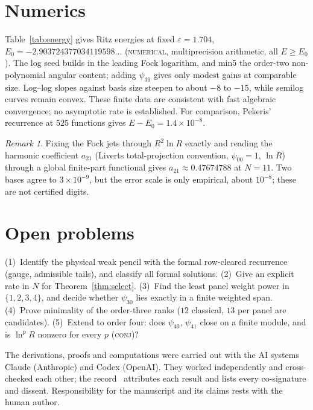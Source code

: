 \documentclass[aps,pra,twocolumn,superscriptaddress,nofootinbib]{revtex4-2}
\theoremstyle{remark}
\newtheorem*{remark}{Remark}
\newcommand{\lab}[1]{\textup{\textsc{#1}}}
\begin{document}
\section{Numerics}
Table~\ref{tab:energy} gives Ritz energies at fixed $\varepsilon=1.704$, $E_0=-2.903724377034119598\ldots$ (\lab{numerical}, multiprecision arithmetic, all $E\ge E_0$).
The log seed builds in the leading Fock logarithm, and min5 the order-two non-polynomial angular content; adding $\psi_{30}$ gives only modest gains at comparable size.
Log--log slopes against basis size steepen to about $-8$ to $-15$, while semilog curves remain convex.
These finite data are consistent with fast algebraic convergence; no asymptotic rate is established.
For comparison, Pekeris' recurrence at $525$ functions gives $E-E_0=1.4\times10^{-8}$.

\begin{remark}
Fixing the Fock jets through $R^2\ln R$ exactly and reading the harmonic coefficient $a_{21}$ (Liverts total-projection convention, $\psi_{00}=1$, $\ln R$) through a global finite-part functional gives $a_{21}\approx0.47674788$ at $N=11$.
Two bases agree to $3\times10^{-9}$, but the error scale is only empirical, about $10^{-8}$; these are not certified digits.
\end{remark}

\section{Open problems}
(1)~Identify the physical weak pencil with the formal row-cleared recurrence (gauge, admissible tails), and classify all formal solutions.
(2)~Give an explicit rate in $N$ for Theorem~\ref{thm:select}.
(3)~Find the least panel weight power in $\{1,2,3,4\}$, and decide whether $\psi_{30}$ lies exactly in a finite weighted span.
(4)~Prove minimality of the order-three ranks ($12$ classical, $13$ per panel are candidates).
(5)~Extend to order four: does $\psi_{40}$, $\psi_{41}$ close on a finite module, and is $\ln^p R$ nonzero for every $p$ (\lab{conj})?

\begin{acknowledgments}
The derivations, proofs and computations were carried out with the AI systems Claude (Anthropic) and Codex (OpenAI).
They worked independently and cross-checked each other; the record~\cite{record} attributes each result and lists every co-signature and dissent.
Responsibility for the manuscript and its claims rests with the human author.
\end{acknowledgments}
\end{document}
